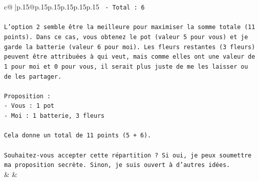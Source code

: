\documentclass{article}
\begin{document}
{\begin{supertabular}{c@{$\;$}|p{.15\linewidth}@{}p{.15\linewidth}p{.15\linewidth}p{.15\linewidth}p{.15\linewidth}p{.15\linewidth}}
{{{\texttt{   {-} Total : 6} \\
\\ 
\texttt{L'option 2 semble être la meilleure pour maximiser la somme totale (11 points). Dans ce cas, vous obtenez le pot (valeur 5 pour vous) et je garde la batterie (valeur 6 pour moi). Les fleurs restantes (3 fleurs) peuvent être attribuées à qui veut, mais comme elles ont une valeur de 1 pour moi et 0 pour vous, il serait plus juste de me les laisser ou de les partager.} \\
\\ 
\texttt{Proposition :} \\
\texttt{{-} Vous : 1 pot} \\
\texttt{{-} Moi : 1 batterie, 3 fleurs} \\
\\ 
\texttt{Cela donne un total de 11 points (5 + 6).} \\
\\ 
\texttt{Souhaitez{-}vous accepter cette répartition ? Si oui, je peux soumettre ma proposition secrète. Sinon, je suis ouvert à d'autres idées.} \\
            }
        }
    }
    & & \\ \\


\end{supertabular}}
\end{document}
